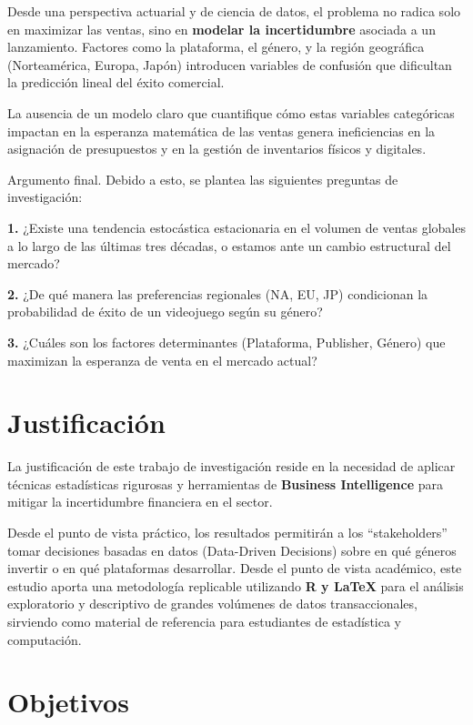 \documentclass[oneside,11pt]{Latex/Classes/PhDthesisPSnPDF}
\begin{document}
Desde una perspectiva actuarial y de ciencia de datos, el problema no
radica solo en maximizar las ventas, sino en \textbf{modelar la
incertidumbre} asociada a un lanzamiento. Factores como la plataforma,
el género, y la región geográfica (Norteamérica, Europa, Japón)
introducen variables de confusión que dificultan la predicción lineal
del éxito comercial.

La ausencia de un modelo claro que cuantifique cómo estas variables
categóricas impactan en la esperanza matemática de las ventas genera
ineficiencias en la asignación de presupuestos y en la gestión de
inventarios físicos y digitales.

Argumento final. Debido a esto, se plantea las siguientes preguntas de
investigación:

\textbf{1.} ¿Existe una tendencia estocástica estacionaria en el volumen
de ventas globales a lo largo de las últimas tres décadas, o estamos
ante un cambio estructural del mercado?

\textbf{2.} ¿De qué manera las preferencias regionales (NA, EU, JP)
condicionan la probabilidad de éxito de un videojuego según su género?

\textbf{3.} ¿Cuáles son los factores determinantes (Plataforma,
Publisher, Género) que maximizan la esperanza de venta en el mercado
actual?

\section{Justificación}

La justificación de este trabajo de investigación reside en la necesidad
de aplicar técnicas estadísticas rigurosas y herramientas de
\textbf{Business Intelligence} para mitigar la incertidumbre financiera
en el sector.

Desde el punto de vista práctico, los resultados permitirán a los
``stakeholders'' tomar decisiones basadas en datos (Data-Driven
Decisions) sobre en qué géneros invertir o en qué plataformas
desarrollar. Desde el punto de vista académico, este estudio aporta una
metodología replicable utilizando \textbf{R y LaTeX} para el análisis
exploratorio y descriptivo de grandes volúmenes de datos
transaccionales, sirviendo como material de referencia para estudiantes
de estadística y computación.

\section{Objetivos}
\end{document}

